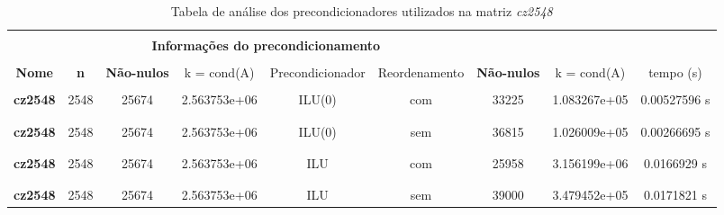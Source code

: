 
\begin{table}[ht]
    \centering
    \begin{tabular}{|c|c|c|c|c|c|c|c|c|}
        \hline \rowcolor{Gray}
        \multicolumn{9}{|c|}{\bfseries Tabela de analise dos precondicionadores }\\
        \hline \rowcolor{Gray}  \multicolumn{4}{|c|}{} & \multicolumn{5}{|c|}{} \\
         [-1em]  \rowcolor{Gray}
         \multicolumn{4}{|c|}{\bfseries Informações da matriz } & \multicolumn{5}{|c|}{\bfseries Informações do precondicionamento }\\
         \hline \rowcolor{Gray} & & & & & & & &  \\
         [-1em]
         \rowcolor{Gray}
         \bfseries Nome & \bfseries n & \bfseries Não-nulos &  
         k = cond(A) & Precondicionador & Reordenamento &
         \bfseries Não-nulos &  
         k = cond(A)  & tempo (s) \\
         \hline \\
         [-1em] \bfseries cz2548 & 2548 & 25674  & 2.563753e+06 & ILU(0) & com & 33225  & 1.083267e+05 & 0.00527596 s \\ & & & & & & & &  \\ [-1em] \hline \\
         [-1em] \bfseries cz2548 & 2548 & 25674  & 2.563753e+06 & ILU(0) & sem & 36815  & 1.026009e+05 & 0.00266695 s \\ & & & & & & & &  \\ [-1em] \hline \\
         [-1em] \bfseries cz2548 & 2548 & 25674  & 2.563753e+06 & ILU & com & 25958  & 3.156199e+06 & 0.0166929 s \\ & & & & & & & &  \\ [-1em] \hline \\
         [-1em] \bfseries cz2548 & 2548 & 25674  & 2.563753e+06  & ILU & sem & 39000  & 3.479452e+05 & 0.0171821 s \\ \hline
    \end{tabular}
    \caption{Tabela de análise dos precondicionadores utilizados na matriz \textit{cz2548}}
    \label{tab:precond-cz}
\end{table}


